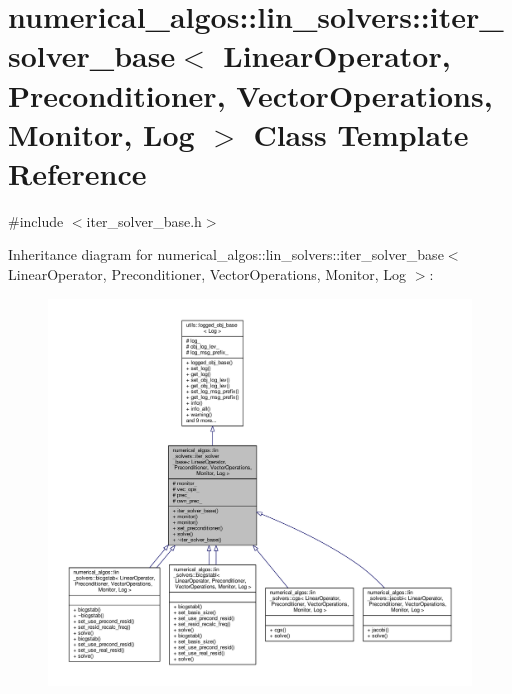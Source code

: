 \hypertarget{classnumerical__algos_1_1lin__solvers_1_1iter__solver__base}{\section{numerical\-\_\-algos\-:\-:lin\-\_\-solvers\-:\-:iter\-\_\-solver\-\_\-base$<$ Linear\-Operator, Preconditioner, Vector\-Operations, Monitor, Log $>$ Class Template Reference}
\label{classnumerical__algos_1_1lin__solvers_1_1iter__solver__base}
}


{\ttfamily \#include $<$iter\-\_\-solver\-\_\-base.\-h$>$}



Inheritance diagram for numerical\-\_\-algos\-:\-:lin\-\_\-solvers\-:\-:iter\-\_\-solver\-\_\-base$<$ Linear\-Operator, Preconditioner, Vector\-Operations, Monitor, Log $>$\-:
\nopagebreak
\begin{figure}[H]
\begin{center}
\leavevmode
\includegraphics[width=350pt]{classnumerical__algos_1_1lin__solvers_1_1iter__solver__base__inherit__graph}
\end{center}
\end{figure}


